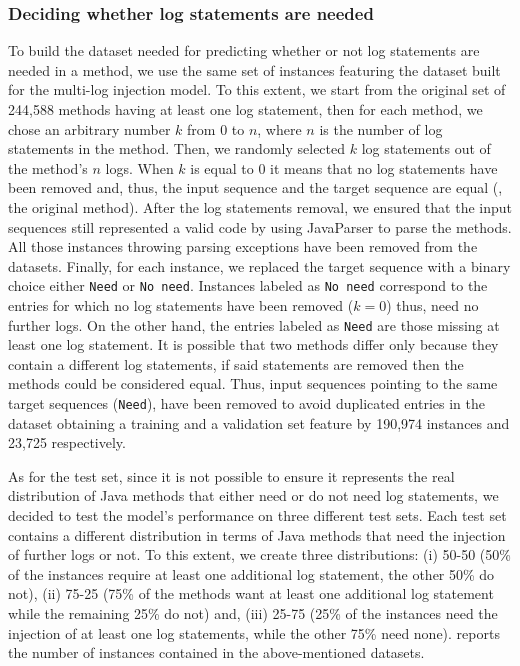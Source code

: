 \subsubsection{Deciding whether log statements are needed}

To build the dataset needed for predicting whether or not log statements are needed in a \java method, we use the same set of instances featuring the dataset built for the multi-log injection model. To this extent, we start from the original set of 244,588 \java methods having at least one log statement, then for each method, we chose an arbitrary number $k$ from 0 to $n$, where $n$ is the number of log statements in the method. Then, we randomly selected $k$ log statements out of the
method's $n$ logs. When $k$ is equal to 0 it means that no log statements have been removed and, thus, the input sequence and the target sequence are equal (\ie, the original \java method). After the log statements removal, we ensured that the input sequences still represented a valid \java code by using JavaParser \cite{javaparser} to parse the methods. All those instances throwing parsing exceptions have been removed from the datasets. 
Finally, for each instance, we replaced the target sequence with a binary choice either \texttt{Need} or \texttt{No need}. Instances labeled as \texttt{No need} correspond to the entries for which no log statements have been removed (\ie $k=0$) thus, need no further logs. On the other hand, the entries labeled as \texttt{Need} are those missing at least one log statement. It is possible that two methods differ only because they contain a different log statements, if said statements are removed then the methods could be considered equal. Thus, input sequences pointing to the same target sequences (\ie \texttt{Need}), have been removed to avoid duplicated entries in the dataset obtaining a training and a validation set feature by 190,974 instances and 23,725 respectively.

As for the test set, since it is not possible to ensure it represents the real distribution of Java methods that either need or do not need log statements, we decided to test the model's performance on three different test sets. Each test set contains a different distribution in terms of Java methods that need the injection of further logs or not. To this extent, we create three distributions:  (i) 50-50 (50\% of the instances require at least one additional log statement, the other 50\% do not), (ii) 75-25 (75\% of the methods want at least one additional log statement while the remaining 25\% do not) and, (iii) 25-75 (25\% of the instances need the injection of at least one log statements, while the other 75\% need none).
 reports the number of instances contained in the above-mentioned datasets.

